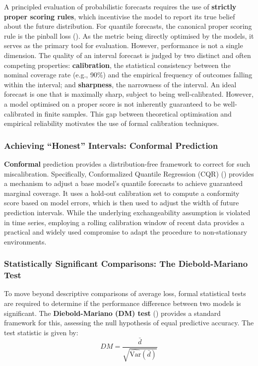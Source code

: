 \documentclass[
  a4paper,
  DIV=11,
  numbers=noendperiod]{scrreprt}
\begin{document}
A principled evaluation of probabilistic forecasts requires the use of
\textbf{strictly proper scoring rules}, which incentivise the model to
report its true belief about the future distribution. For quantile
forecasts, the canonical proper scoring rule is the pinball loss
(). As the metric
being directly optimised by the models, it serves as the primary tool
for evaluation. However, performance is not a single dimension. The
quality of an interval forecast is judged by two distinct and often
competing properties: \textbf{calibration}, the statistical consistency
between the nominal coverage rate (e.g., 90\%) and the empirical
frequency of outcomes falling within the interval; and
\textbf{sharpness}, the narrowness of the interval. An ideal forecast is
one that is maximally sharp, subject to being well-calibrated. However,
a model optimised on a proper score is not inherently guaranteed to be
well-calibrated in finite samples. This gap between theoretical
optimisation and empirical reliability motivates the use of formal
calibration techniques.

\subsubsection{Achieving ``Honest'' Intervals: Conformal
Prediction}\label{achieving-honest-intervals-conformal-prediction}

\textbf{Conformal} prediction provides a distribution-free framework to
correct for such miscalibration. Specifically, Conformalized Quantile
Regression (CQR) () provides a mechanism to adjust a base model's quantile
forecasts to achieve guaranteed marginal coverage. It uses a hold-out
calibration set to compute a conformity score based on model errors,
which is then used to adjust the width of future prediction intervals.
While the underlying exchangeability assumption is violated in time
series, employing a rolling calibration window of recent data provides a
practical and widely used compromise to adapt the procedure to
non-stationary environments.

\subsubsection{Statistically Significant Comparisons: The
Diebold-Mariano
Test}\label{statistically-significant-comparisons-the-diebold-mariano-test}

To move beyond descriptive comparisons of average loss, formal
statistical tests are required to determine if the performance
difference between two models is significant. The
\textbf{Diebold-Mariano (DM) test} () provides a standard framework for this, assessing
the null hypothesis of equal predictive accuracy. The test statistic is
given by: \[
DM = \frac{\bar{d}}{\sqrt{\hat{\text{Var}}(\bar{d})}}
\]
\end{document}
